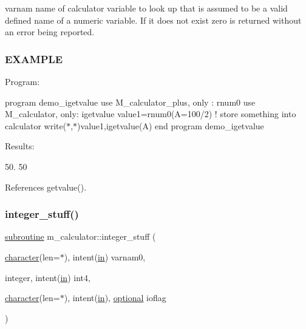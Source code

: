 varnam name of calculator variable to look up that is assumed to be a valid defined name of a numeric variable. If it does not exist zero is returned without an error being reported.

\subsubsection*{E\+X\+A\+M\+P\+LE}

Program\+:

program demo\+\_\+igetvalue use M\+\_\+calculator\+\_\+plus, only \+: rnum0 use M\+\_\+calculator, only\+: igetvalue value1=rnum0(\textquotesingle{}A=100/2\textquotesingle{}) ! store something into calculator write($\ast$,$\ast$)value1,igetvalue(\textquotesingle{}A\textquotesingle{}) end program demo\+\_\+igetvalue

Results\+:

50. 50 

References getvalue().

\mbox{\label{namespacem__calculator_ae760c3bf7e4e933427bad6c92cd16dfb}} 
\subsubsection{\texorpdfstring{integer\+\_\+stuff()}{integer\_stuff()}}
{\footnotesize\ttfamily \hyperlink{M__stopwatch_83_8txt_acfbcff50169d691ff02d4a123ed70482}{subroutine} m\+\_\+calculator\+::integer\+\_\+stuff (\begin{DoxyParamCaption}\item[{\hyperlink{option__stopwatch_83_8txt_abd4b21fbbd175834027b5224bfe97e66}{character}(len=$\ast$), intent(\hyperlink{M__journal_83_8txt_afce72651d1eed785a2132bee863b2f38}{in})}]{varnam0,  }\item[{integer, intent(\hyperlink{M__journal_83_8txt_afce72651d1eed785a2132bee863b2f38}{in})}]{int4,  }\item[{\hyperlink{option__stopwatch_83_8txt_abd4b21fbbd175834027b5224bfe97e66}{character}(len=$\ast$), intent(\hyperlink{M__journal_83_8txt_afce72651d1eed785a2132bee863b2f38}{in}), \hyperlink{option__stopwatch_83_8txt_aa4ece75e7acf58a4843f70fe18c3ade5}{optional}}]{ioflag }\end{DoxyParamCaption})\hspace{0.3cm}{\ttfamily [private]}}



